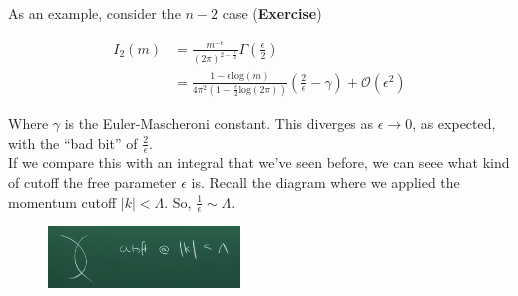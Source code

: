 \documentclass[10pt]{article}
\begin{document}
\noindent As an example, consider the $n-2$ case (\textbf{Exercise})

\begin{align}
I_2 (m) &= \frac{m^{-\epsilon}}{(2\pi)^{2-\frac{\epsilon}{2}}} \Gamma \left(\frac{\epsilon}{2} \right) \\
&= \frac{1-\epsilon \text{log}(m)}{4\pi^2(1-\frac{\epsilon}{2} \text{log}(2\pi))} \left(\frac{2}{\epsilon} - \gamma \right) + \mathcal{O} (\epsilon^2)
\end{align}

\noindent Where $\gamma$ is the Euler-Mascheroni constant. This diverges as $\epsilon \rightarrow 0$, as expected, with the ``bad bit'' of $\frac{2}{\epsilon}$. \\

\noindent If we compare this with an integral that we've seen before, we can seee what kind of cutoff the free parameter $\epsilon$ is. Recall the diagram where we applied the momentum cutoff $|k| < \Lambda$. So, $\frac{1}{\epsilon} \sim \Lambda$.

\begin{figure}[H]
	\centering
	\includegraphics[width=2in]{images/firstcutoff.png}
\end{figure}

%

\end{document}
